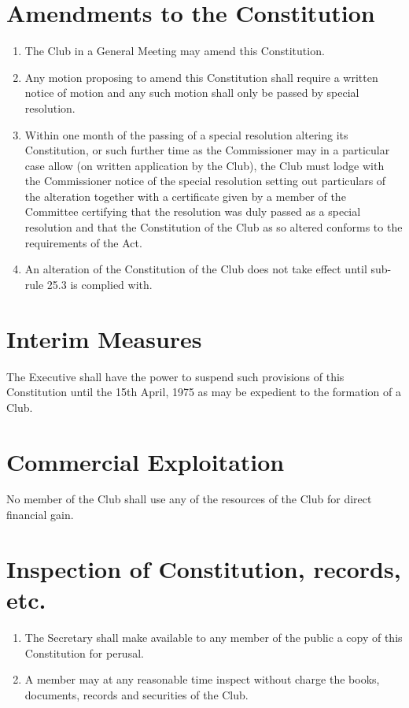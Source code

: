 \documentclass[11pt]{article} %
\begin{document}
\section{Amendments to the Constitution}
\begin{enumerate}
	\item The Club in a General Meeting may amend this Constitution.
	\item Any motion proposing to amend this Constitution shall require a written notice of motion and any such motion shall only be passed by special resolution.
	\item Within one month of the passing of a special resolution altering its Constitution, or such further time as the Commissioner may in a particular case allow (on written application by the Club), the Club must lodge with the Commissioner notice of the special resolution setting out particulars of the alteration together with a certificate given by a member of the Committee certifying that the resolution was duly passed as a special resolution and that the Constitution of the Club as so altered conforms to the requirements of the Act.
	\item An alteration of the Constitution of the Club does not take effect until sub-rule 25.3 is complied with.
\end{enumerate}

\section{Interim Measures}
The Executive shall have the power to suspend such provisions of this Constitution until the 15th April, 1975 as may be expedient to the formation of a Club.\\

\section{Commercial Exploitation}
No member of the Club shall use any of the resources of the Club for direct financial gain.

\section{Inspection of Constitution, records, etc.}
\begin{enumerate}
	\item The Secretary shall make available to any member of the public a copy of this Constitution for perusal.
	\item A member may at any reasonable time inspect without charge the books, documents, records and securities of the Club.
\end{enumerate}
\end{document}
